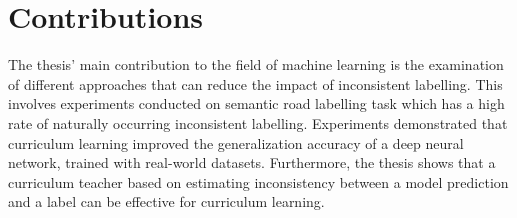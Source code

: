 \section{Contributions}
\label{sec:IntroContributions}
The thesis' main contribution to the field of machine learning  is the examination of different approaches that can reduce the impact of inconsistent labelling. This involves experiments conducted on semantic road labelling task which has a high rate of naturally occurring inconsistent labelling. Experiments demonstrated that curriculum learning improved the generalization accuracy of a deep neural network, trained with real-world datasets. Furthermore, the thesis shows that a curriculum teacher based on estimating inconsistency between a model prediction and a label can be effective for curriculum learning.